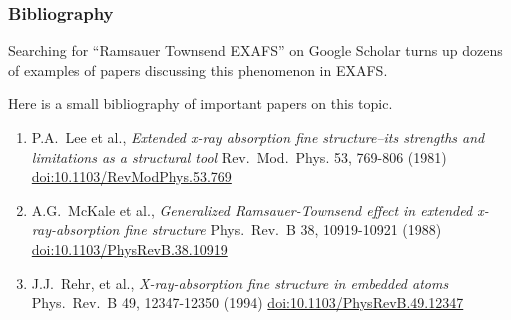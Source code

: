 \documentclass[10pt, xcolor=x11names, compress]{beamer}
\begin{document}
\begin{frame}
  \frametitle{Bibliography}

  Searching for ``Ramsauer Townsend EXAFS'' on Google Scholar turns up
  dozens of examples of papers discussing this phenomenon in EXAFS.

  \medskip

  Here is a small bibliography of important papers on this topic.
  
  \begin{enumerate}
  \item P.A.\ Lee et al.,
    \textit{Extended x-ray absorption fine structure--its strengths and limitations as a structural tool}
    Rev.\ Mod.\ Phys. 53, 769-806 (1981)
    \href{http://dx.doi.org/10.1103/RevModPhys.53.769}
    {\color{Blue2}doi:10.1103/RevModPhys.53.769}
  \item A.G.\ McKale et al., \textit{Generalized Ramsauer-Townsend
      effect in extended x-ray-absorption fine structure} Phys.\ Rev.\ B
    38, 10919-10921 (1988)
    \href{http://dx.doi.org/10.1103/PhysRevB.38.10919}
    {\color{Blue2}doi:10.1103/PhysRevB.38.10919}
  \item J.J.\ Rehr, et al., \textit{X-ray-absorption fine structure in
      embedded atoms} Phys.\ Rev.\ B 49, 12347-12350 (1994)
    \href{http://dx.doi.org/10.1103/PhysRevB.49.12347}
    {\color{Blue2}doi:10.1103/PhysRevB.49.12347}
  \end{enumerate}
\end{frame}
\end{document}
